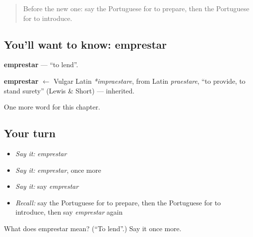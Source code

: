 \begin{quote}
Before the new one: say the Portuguese for to prepare, then the Portuguese for to introduce.
\end{quote}

\subsection*{You'll want to know: emprestar}
\textbf{emprestar} — \textquotedblleft{}to lend\textquotedblright{}.

\begin{cousinweb}
\textbf{emprestar} $\leftarrow$ Vulgar Latin \emph{*impraestare}, from Latin \emph{praestare}, \textquotedblleft{}to provide, to stand surety\textquotedblright{} (Lewis \& Short) — inherited.
\end{cousinweb}

\begin{grammarlens}[title={What you've built}]
One more word for this chapter.
\end{grammarlens}

\subsection*{Your turn}
\begin{itemize}
\raggedright
  \item \emph{Say it:} \emph{emprestar}
  \item \emph{Say it:} \emph{emprestar}, once more
  \item \emph{Say it:} say \emph{emprestar}
  \item \emph{Recall:} say the Portuguese for to prepare, then the Portuguese for to introduce, then say \emph{emprestar} again
\end{itemize}

\begin{tcolorbox}[breakable,colback=teal!4,colframe=teal!35!black,title={Before you move on}]
What does emprestar mean? (\textquotedblleft{}To lend\textquotedblright{}.) Say it once more.
\end{tcolorbox}
